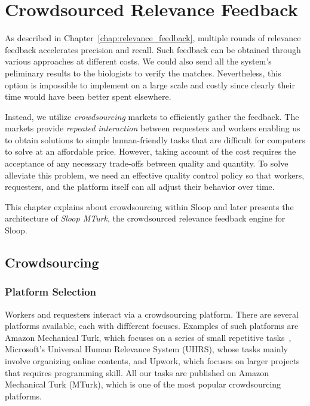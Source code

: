 \graphicspath{{./images/chap5/}}
\chapter{Crowdsourced Relevance Feedback}
\label{chap:sloop_mturk}

As described in Chapter~\ref{chap:relevance_feedback}, multiple rounds of
relevance feedback accelerates precision and recall. Such feedback can be 
obtained through various approaches at different costs. We could also send all
the system's peliminary results to the biologists to verify the matches.
Nevertheless, this option is impossible to implement on a large scale and costly
since clearly their time would have been better spent elsewhere.

Instead, we utilize \emph{crowdsourcing} markets to efficiently gather the
feedback. The markets provide \emph{repeated interaction} between 
requesters and workers enabling us to obtain solutions to simple human-friendly
tasks that are difficult for computers to solve at an affordable price. However,
taking account of the cost requires the acceptance of any necessary trade-offs
between quality and quantity. To solve alleviate this problem, we need an
effective quality control policy so that workers, requesters, and the platform
itself can all adjust their behavior over time. 

This chapter explains about crowdsourcing within Sloop and later presents the
architecture of \emph{Sloop MTurk}, the crowdsourced relevance feedback engine
for Sloop.

\section{Crowdsourcing} %
\label{sec:crowdsourcing}

  \subsection{Platform Selection}

  Workers and requesters interact via a crowdsourcing platform. There are several 
  platforms available, each with diffferent focuses. Examples of such
  platforms are 
  Amazon Mechanical Turk, which focuses on a series of small repetitive tasks~\cite{sliv14}, 
  Microsoft’s Universal Human Relevance System (UHRS), whose tasks mainly involve organizing online contents, 
  and Upwork, which focuses on larger projects that requires programming skill.
  All our tasks are published on Amazon Mechanical Turk (MTurk), which is one of the most
  popular crowdsourcing platforms.

